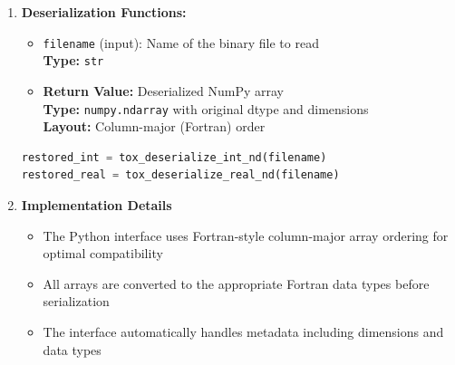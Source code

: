 \documentclass[11pt]{article}
\begin{document}
\begin{enumerate}
\begin{enumerate}
\begin{itemize}
	      	      	\item \texttt{filename} (input): Name of the binary file to create \\
	      	      	      \textbf{Type:} \texttt{str}
	      	      \end{itemize}
	      	      \begin{lstlisting}[language=Python, caption={Example usage of serialization function}]
tox_serialize_int_nd(int_array, filename)
tox_serialize_real_nd(real_array, filename)
	      	      \end{lstlisting}
	      	      
	      	\item \textbf{Deserialization Functions:}
	      	      \begin{itemize}
	      	      	\item \texttt{filename} (input): Name of the binary file to read \\ \textbf{Type:}
	      	      	      \texttt{str}
	      	      	      
	      	      	\item \textbf{Return Value:} Deserialized NumPy array \\ \textbf{Type:}
	      	      	      \texttt{numpy.ndarray} with original dtype and dimensions \\
	      	      	      \textbf{Layout:} Column-major (Fortran) order
	      	      \end{itemize}
	      	      
	      	      \begin{lstlisting}[language=Python, caption={Example usage of deserialization function}]
restored_int = tox_deserialize_int_nd(filename)
restored_real = tox_deserialize_real_nd(filename)
	      	      \end{lstlisting}
	      	      
	      	\item \textbf{Implementation Details}
	      	      
	      	      \begin{itemize}
	      	      	\item The Python interface uses Fortran-style column-major array ordering
	      	      	      for optimal compatibility
	      	      	      
	      	      	\item All arrays are converted to the appropriate Fortran data types
	      	      	      before serialization
	      	      	      
	      	      	\item The interface automatically handles metadata including dimensions
	      	      	      and data types
	      	      	      

\end{itemize}
\end{enumerate}
\end{enumerate}
\end{document}
